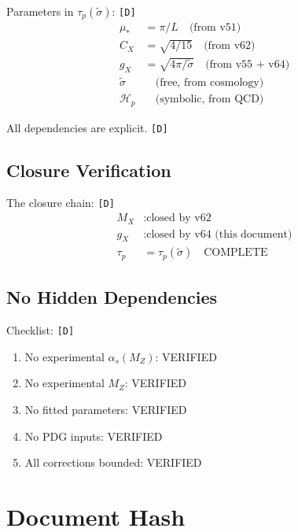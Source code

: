 \documentclass[11pt,a4paper]{article}
\newcommand{\tagD}{\textcolor{green!50!black}{\texttt{[D]}}}
\theoremstyle{definition}
\begin{document}
Parameters in $\tau_p(\tilde{\sigma})$: \tagD{}
\begin{align}
\label{eq:app-comp-1}
\mu_* &= \pi/L \quad \text{(from v51)} \\
\label{eq:app-comp-2}
C_X &= \sqrt{4/15} \quad \text{(from v62)} \\
\label{eq:app-comp-3}
g_X &= \sqrt{4\pi/\tilde{\sigma}} \quad \text{(from v55 + v64)} \\
\label{eq:app-comp-4}
\tilde{\sigma} &\quad \text{(free, from cosmology)} \\
\label{eq:app-comp-5}
\mathcal{H}_p &\quad \text{(symbolic, from QCD)}
\end{align}

All dependencies are explicit. \tagD{}

\subsection{Closure Verification}
\label{app:closure-verify}

The closure chain: \tagD{}
\begin{align}
\label{eq:app-clos-1}
M_X &: \text{closed by v62} \\
\label{eq:app-clos-2}
g_X &: \text{closed by v64 (this document)} \\
\label{eq:app-clos-3}
\tau_p &= \tau_p(\tilde{\sigma}) \quad \text{COMPLETE}
\end{align}

\subsection{No Hidden Dependencies}
\label{app:no-hidden}

Checklist: \tagD{}
\begin{enumerate}
  \item No experimental $\alpha_s(M_Z)$: VERIFIED
  \item No experimental $M_Z$: VERIFIED
  \item No fitted parameters: VERIFIED
  \item No PDG inputs: VERIFIED
  \item All corrections bounded: VERIFIED
\end{enumerate}


\section*{Document Hash}
\label{sec:hash}
\end{document}
